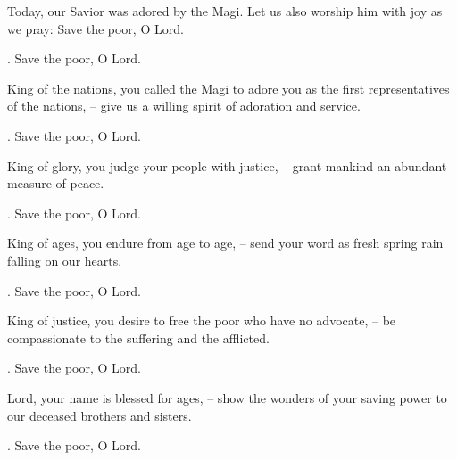 \lettrine[loversize=0.15,lines=2]{T}{}oday, our Savior was adored by the Magi. Let us also worship him with joy as we pray: Save the poor, O Lord.
\par \Rbar. Save the poor, O Lord.

King of the nations, you called the Magi to adore you as the first representatives of the nations,
– give us a willing spirit of adoration and service.
\par \Rbar. Save the poor, O Lord.

King of glory, you judge your people with justice,
– grant mankind an abundant measure of peace.
\par \Rbar. Save the poor, O Lord.

King of ages, you endure from age to age,
– send your word as fresh spring rain falling on our hearts.
\par \Rbar. Save the poor, O Lord.

King of justice, you desire to free the poor who have no advocate,
– be compassionate to the suffering and the afflicted.
\par \Rbar. Save the poor, O Lord.

Lord, your name is blessed for ages,
– show the wonders of your saving power to our deceased brothers and sisters.
\par \Rbar. Save the poor, O Lord.